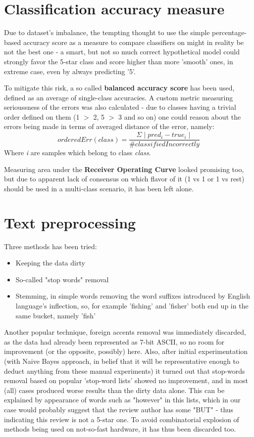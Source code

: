 \documentclass[letterpaper]{article}
\begin{document}
\section{Classification accuracy measure}
Due to dataset's imbalance, the tempting thought to use the simple percentage-based accuracy score as a measure
to compare classifiers on might in reality be not the best one - a smart, but not so much correct hypothetical model
could strongly favor the 5-star class and score higher than more 'smooth' ones, in extreme case, even by always predicting '5'.

To mitigate this risk, a so called \textbf{balanced accuracy score} has been used, defined as an average of single-class accuracies.
A custom metric measuring serioussness of the errors was also calculated - due to classes having a trivial
order defined on them (1 $>$ 2, 5 $>$ 3 and so on) one could reason about the errors being made
in terms of averaged distance of the error, namely:
\[ orderedErr(class) = \frac{\Sigma \mid pred_i - true_i \mid}{\# classifiedIncorrectly} \]
Where \textit{i} are samples which belong to class \textit{class}.

Measuring area under the \textbf{Receiver Operating Curve} looked promising too, but due to apparent lack of consensus on
which flavor of it (1 vs 1 or 1 vs rest) should be used in a multi-class scenario, it has been left alone.

\section{Text preprocessing}
Three methods has been tried:
\begin{itemize}
    \item Keeping the data dirty
    \item So-called "stop words" removal
    \item Stemming, in simple words removing the word suffixes introduced by English language's  inflection,
    so, for example 'fishing' and 'fisher' both end up in the same bucket, namely 'fish'
\end{itemize}
Another popular technique, foreign accents removal was immediately discarded, as the data had already been
represented as 7-bit ASCII, so no room for improvement (or the opposite, possibly) here.
Also, after initial experimentation (with Naive Bayes approach, in belief that it will be representative
enough to deduct anything from these manual experiments) it turned out that stop-words removal based on
popular 'stop-word lists' showed no improvement, and in most (all) cases produced worse results than the
dirty data alone. This can be explained by appearance of words such as "however" in this lists,
which in our case would probably suggest that the review author has some "BUT" - thus indicating this review is not a 5-star one.
To avoid combinatorial explosion of methods being used on not-so-fast hardware,
it has thus been discarded too.
\end{document}
